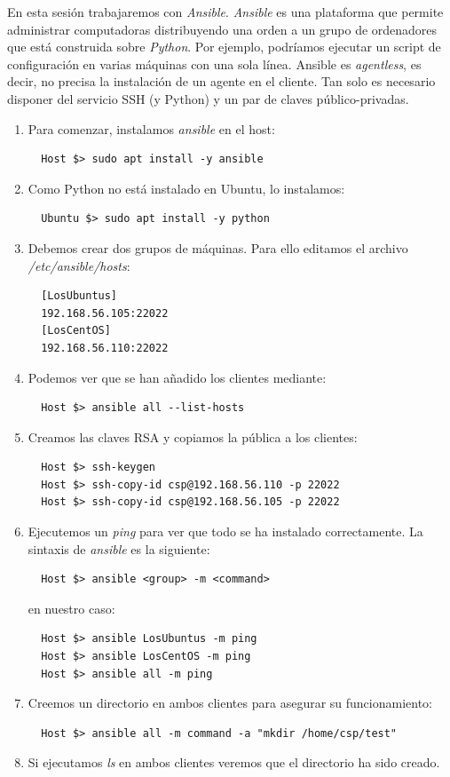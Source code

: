 \documentclass[12pt,spanish]{article}
\begin{document}
En esta sesión trabajaremos con \textit{Ansible}. \textit{Ansible} es una plataforma que permite administrar computadoras distribuyendo una orden a un grupo de ordenadores que está construida sobre \textit{Python}. Por ejemplo, podríamos ejecutar un script de configuración en varias máquinas con una sola línea. Ansible es \textit{agentless}, es decir, no precisa la instalación de un agente en el cliente. Tan solo es necesario disponer del servicio SSH (y Python) y un par de claves público-privadas.
\begin{enumerate}
  \item Para comenzar, instalamos \textit{ansible} en el host:
  \begin{lstlisting}
  Host $> sudo apt install -y ansible
  \end{lstlisting}
  \item Como Python no está instalado en Ubuntu, lo instalamos:
  \begin{lstlisting}
  Ubuntu $> sudo apt install -y python
  \end{lstlisting}
  \item Debemos crear dos grupos de máquinas. Para ello editamos el archivo \textit{/etc/ansible/hosts}:
  \begin{lstlisting}
  [LosUbuntus]
  192.168.56.105:22022
  [LosCentOS]
  192.168.56.110:22022
  \end{lstlisting}
  \item Podemos ver que se han añadido los clientes mediante:
  \begin{lstlisting}
  Host $> ansible all --list-hosts
  \end{lstlisting}
  \item Creamos las claves RSA y copiamos la pública a los clientes:
  \begin{lstlisting}
  Host $> ssh-keygen
  Host $> ssh-copy-id csp@192.168.56.110 -p 22022
  Host $> ssh-copy-id csp@192.168.56.105 -p 22022
  \end{lstlisting}
  \item Ejecutemos un \textit{ping} para ver que todo se ha instalado correctamente. La sintaxis de \textit{ansible} es la siguiente:
  \begin{lstlisting}
  Host $> ansible <group> -m <command>
  \end{lstlisting}
  en nuestro caso:
  \begin{lstlisting}
  Host $> ansible LosUbuntus -m ping
  Host $> ansible LosCentOS -m ping
  Host $> ansible all -m ping
  \end{lstlisting}
  \item Creemos un directorio en ambos clientes para asegurar su funcionamiento:
  \begin{lstlisting}
  Host $> ansible all -m command -a "mkdir /home/csp/test"
  \end{lstlisting}
  \item Si ejecutamos \textit{ls} en ambos clientes veremos que el directorio ha sido creado.
\end{enumerate}
\end{document}

